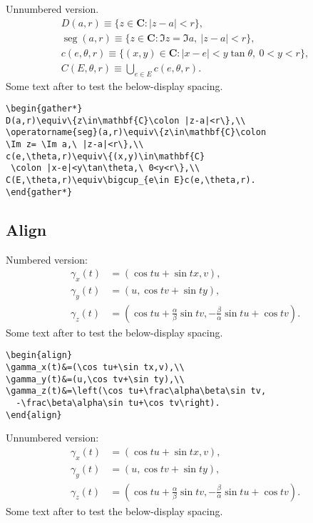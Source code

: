 \documentclass[draft]{amsart}
\theoremstyle{definition}
\theoremstyle{remark}
\begin{document}
Unnumbered version.
\begin{gather*}
D(a,r)\equiv\{z\in\mathbf{C}\colon |z-a|<r\},\\
\operatorname{seg}(a,r)\equiv\{z\in\mathbf{C}\colon
\Im z= \Im a,\ |z-a|<r\},\\
c(e,\theta,r)\equiv\{(x,y)\in\mathbf{C}
 \colon |x-e|<y\tan\theta,\ 0<y<r\},\\
C(E,\theta,r)\equiv\bigcup_{e\in E}c(e,\theta,r).
\end{gather*}
Some text after to test the below-display spacing.
\begin{verbatim}
\begin{gather*}
D(a,r)\equiv\{z\in\mathbf{C}\colon |z-a|<r\},\\
\operatorname{seg}(a,r)\equiv\{z\in\mathbf{C}\colon
\Im z= \Im a,\ |z-a|<r\},\\
c(e,\theta,r)\equiv\{(x,y)\in\mathbf{C}
 \colon |x-e|<y\tan\theta,\ 0<y<r\},\\
C(E,\theta,r)\equiv\bigcup_{e\in E}c(e,\theta,r).
\end{gather*}
\end{verbatim}

\newpage
\subsection{Align}
Numbered version:
\begin{align}
\gamma_x(t)&=(\cos tu+\sin tx,v),\\
\gamma_y(t)&=(u,\cos tv+\sin ty),\\
\gamma_z(t)&=\left(\cos tu+\frac\alpha\beta\sin tv,
  -\frac\beta\alpha\sin tu+\cos tv\right).
\end{align}
Some text after to test the below-display spacing.

\begin{verbatim}
\begin{align}
\gamma_x(t)&=(\cos tu+\sin tx,v),\\
\gamma_y(t)&=(u,\cos tv+\sin ty),\\
\gamma_z(t)&=\left(\cos tu+\frac\alpha\beta\sin tv,
  -\frac\beta\alpha\sin tu+\cos tv\right).
\end{align}
\end{verbatim}

Unnumbered version:
\begin{align*}
\gamma_x(t)&=(\cos tu+\sin tx,v),\\
\gamma_y(t)&=(u,\cos tv+\sin ty),\\
\gamma_z(t)&=\left(\cos tu+\frac\alpha\beta\sin tv,
  -\frac\beta\alpha\sin tu+\cos tv\right).
\end{align*}
Some text after to test the below-display spacing.
\end{document}
